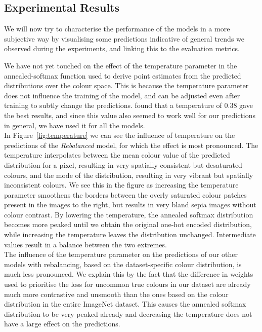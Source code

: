 \documentclass{article}
\begin{document}
\subsection{Experimental Results}
We will now try to characterise the performance of the models in a more subjective way
by visualising some predictions indicative of general trends we observed during the experiments, and
linking this to the evaluation metrics.

We have not yet touched on the effect of the temperature parameter in the annealed-softmax
function used to derive point estimates from the predicted distributions over the colour space.
This is because the temperature parameter does not influence the training of the model,
and can be adjusted even after training to subtly change the predictions.
\cite{colourful} found that a temperature of 0.38 gave the best results, and since this
value also seemed to work well for our predictions in general, we have used it for all the models.\\
In Figure~\ref{fig:temperature} we can see the influence of temperature on the predictions of the \textit{Rebalanced} model,
for which the effect is most pronounced.
The temperature interpolates between the mean colour value of the predicted distribution for a pixel,
resulting in very spatially consistent but desaturated colours, and the mode of the distribution, resulting
in very vibrant but spatially inconsistent colours.
We see this in the figure as increasing the temperature parameter smoothens the borders between the overly saturated colour patches
present in the images to the right, but results in very bland sepia images without colour contrast.
By lowering the temperature,
the annealed softmax distribution becomes more peaked until we obtain the original one-hot encoded distribution,
while increasing the temperature leaves the distribution unchanged.
Intermediate values result in a balance between the two extremes.\\
The influence of the temperature parameter on the predictions of our other models with rebalancing, based on
the dataset-specific colour distribution, is much less pronounced.
We explain this by the fact that the difference in weights used to prioritise the loss for uncommon true colours in our dataset
are already much more contrastive and unsmooth than the ones based on the colour distribution in the entire ImageNet dataset.
This causes the annealed softmax distribution to be very peaked already and decreasing the temperature does not have a large effect on the predictions.
\end{document}
